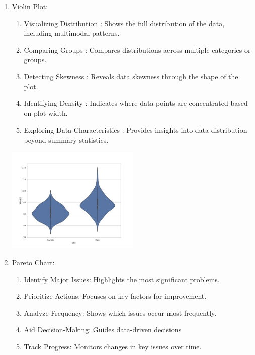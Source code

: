\documentclass[12pt]{article}
\begin{document}
\begin{enumerate}
    \item Violin Plot:
    \begin{enumerate}
        \item Visualizing Distribution : Shows the full distribution of the data, including multimodal patterns.
        \item Comparing Groups : Compares distributions across multiple categories or groups.
        \item Detecting Skewness : Reveals data skewness through the shape of the plot.
        \item Identifying Density : Indicates where data points are concentrated based on plot width.
        \item Exploring Data Characteristics : Provides insights into data distribution beyond summary statistics.
    \end{enumerate}
    \begin{minipage}{\linewidth}
        \begin{center}
            \includegraphics[width=0.5\textwidth]{violin_plot.jpg}
            \label{fig:Violin_Plot}
        \end{center}
    \end{minipage}
    \item Pareto Chart:
    \begin{enumerate}
        \item Identify Major Issues: Highlights the most significant problems.
        \item Prioritize Actions: Focuses on key factors for improvement.
        \item Analyze Frequency: Shows which issues occur most frequently.
        \item Aid Decision-Making: Guides data-driven decisions
        \item Track Progress: Monitors changes in key issues over time.

\end{enumerate}
\end{enumerate}
\end{document}
